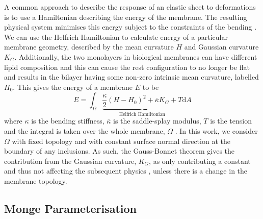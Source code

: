A common approach to describe the response of an elastic sheet to deformations is to use a Hamiltonian describing the energy of the membrane. The resulting physical system minimises this energy subject to the constraints of the bending \cite{deserno_fluid_nodate}. We can use the Helfrich Hamiltonian to calculate energy of a particular membrane geometry, described by the mean curvature $H$ and Gaussian curvature $K_G$. Additionally, the two monolayers in biological membranes can have different lipid composition and this can cause the rest configuration to no longer be flat and results in the bilayer having some non-zero intrinsic mean curvature, labelled $H_0$. This gives the energy of a membrane $E$ to be
\begin{equation}
    E = \int_{\Omega}\underbrace{\frac{\kappa}{2}(H-H_0)^2 + \overline{\kappa}K_G + T}_{\text{Helfrich Hamiltonian}}\text{d}A
    \label{helfrich}
\end{equation}
where $\kappa$ is the bending stiffness, $\overline{\kappa}$ is the saddle-splay modulus, $T$ is the tension and the integral is taken over the whole membrane, $\Omega$ \cite{kwiecinski_interactions_2020}. In this work, we consider $\Omega$ with fixed topology and with constant surface normal direction at the boundary of any inclusions. As such, the Gauss-Bonnet theorem gives the contribution from the Gaussian curvature, $K_G$, as only contributing a constant and thus not affecting the subsequent physics \cite{deserno_fluid_nodate}, unless there is a change in the membrane topology.

\subsection{Monge Parameterisation}

